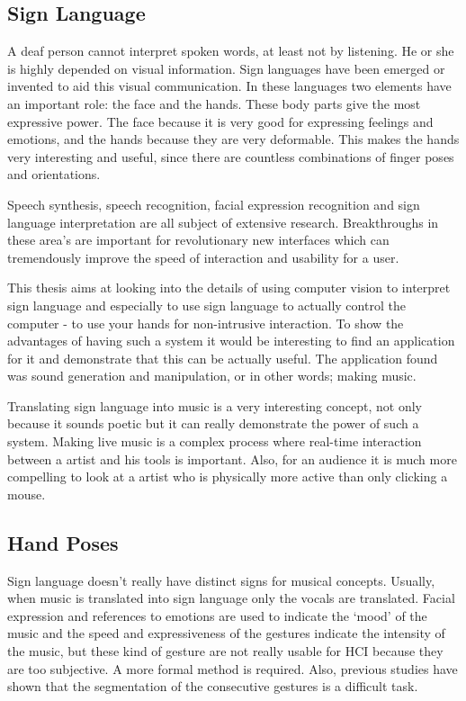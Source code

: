 \subsection*{Sign Language}

A deaf person cannot interpret spoken words, at least not by listening. He or she is highly depended on visual information. Sign languages have been emerged or invented to aid this visual communication. In these languages two elements have an important role: the face and the hands. These body parts give the most expressive power. The face because it is very good for expressing feelings and emotions, and the hands because they are very deformable. This makes the hands very interesting and useful, since there are countless combinations of finger poses and orientations. 

Speech synthesis\citep{Schroder2001, Hunt1996}, speech recognition\citep{rabiner1993, rabiner1989}, facial expression recognition\citep{Cohen2003, zhang2002} and sign language interpretation\citep{Buehler2009,RichardBowden2004,Cooper2007} are all subject of extensive research. Breakthroughs in these area's are important for revolutionary new interfaces which can tremendously improve the speed of interaction and usability for a user. 



This thesis aims at looking into the details of using computer vision to interpret sign language and especially to use sign language to actually control the computer - to use your hands for non-intrusive interaction. To show the advantages of having such a system it would be interesting to find an application for it and demonstrate that this can be actually useful. The application found was sound generation and manipulation, or in other words; making music. 

Translating sign language into music is a very interesting concept, not only because it sounds poetic but it can really demonstrate the power of such a system. Making live music is a complex process where real-time interaction between a artist and his tools is important. Also, for an audience it is much more compelling to look at a artist who is physically more active than only clicking a mouse.

\subsection*{Hand Poses}
Sign language doesn't really have distinct signs for musical concepts. Usually, when music is translated into sign language only the vocals are translated. Facial expression and references to emotions are used to indicate the `mood' of the music and the speed and expressiveness of the gestures indicate the intensity of the music, but these kind of gesture are not really usable for HCI because they are too subjective. A more formal method is required. Also, previous studies have shown that the segmentation of the consecutive gestures is a difficult task\citep{Buehler2009,RichardBowden2004}.

